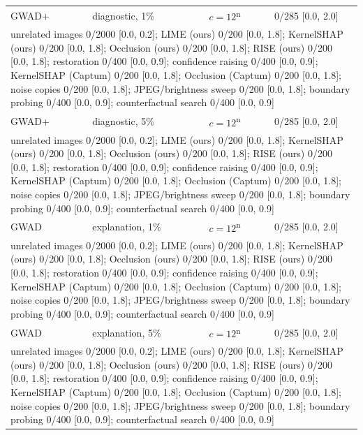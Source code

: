 \begin{footnotesize}
\begin{longtable}{p{1.6cm}p{2.6cm}p{2.8cm}p{4.6cm}}
GWAD+ & diagnostic, 1\% & $c=12$\textsuperscript{n} & 0/285 [0.0, 2.0] \\
\multicolumn{4}{p{12.8cm}}{\raggedright\quad unrelated images 0/2000 [0.0, 0.2]; LIME (ours) 0/200 [0.0, 1.8]; KernelSHAP (ours) 0/200 [0.0, 1.8]; Occlusion (ours) 0/200 [0.0, 1.8]; RISE (ours) 0/200 [0.0, 1.8]; restoration 0/400 [0.0, 0.9]; confidence raising 0/400 [0.0, 0.9]; KernelSHAP (Captum) 0/200 [0.0, 1.8]; Occlusion (Captum) 0/200 [0.0, 1.8]; noise copies 0/200 [0.0, 1.8]; JPEG/brightness sweep 0/200 [0.0, 1.8]; boundary probing 0/400 [0.0, 0.9]; counterfactual search 0/400 [0.0, 0.9]} \\[4pt]
GWAD+ & diagnostic, 5\% & $c=12$\textsuperscript{n} & 0/285 [0.0, 2.0] \\
\multicolumn{4}{p{12.8cm}}{\raggedright\quad unrelated images 0/2000 [0.0, 0.2]; LIME (ours) 0/200 [0.0, 1.8]; KernelSHAP (ours) 0/200 [0.0, 1.8]; Occlusion (ours) 0/200 [0.0, 1.8]; RISE (ours) 0/200 [0.0, 1.8]; restoration 0/400 [0.0, 0.9]; confidence raising 0/400 [0.0, 0.9]; KernelSHAP (Captum) 0/200 [0.0, 1.8]; Occlusion (Captum) 0/200 [0.0, 1.8]; noise copies 0/200 [0.0, 1.8]; JPEG/brightness sweep 0/200 [0.0, 1.8]; boundary probing 0/400 [0.0, 0.9]; counterfactual search 0/400 [0.0, 0.9]} \\[4pt]
GWAD & explanation, 1\% & $c=12$\textsuperscript{n} & 0/285 [0.0, 2.0] \\
\multicolumn{4}{p{12.8cm}}{\raggedright\quad unrelated images 0/2000 [0.0, 0.2]; LIME (ours) 0/200 [0.0, 1.8]; KernelSHAP (ours) 0/200 [0.0, 1.8]; Occlusion (ours) 0/200 [0.0, 1.8]; RISE (ours) 0/200 [0.0, 1.8]; restoration 0/400 [0.0, 0.9]; confidence raising 0/400 [0.0, 0.9]; KernelSHAP (Captum) 0/200 [0.0, 1.8]; Occlusion (Captum) 0/200 [0.0, 1.8]; noise copies 0/200 [0.0, 1.8]; JPEG/brightness sweep 0/200 [0.0, 1.8]; boundary probing 0/400 [0.0, 0.9]; counterfactual search 0/400 [0.0, 0.9]} \\[4pt]
GWAD & explanation, 5\% & $c=12$\textsuperscript{n} & 0/285 [0.0, 2.0] \\
\multicolumn{4}{p{12.8cm}}{\raggedright\quad unrelated images 0/2000 [0.0, 0.2]; LIME (ours) 0/200 [0.0, 1.8]; KernelSHAP (ours) 0/200 [0.0, 1.8]; Occlusion (ours) 0/200 [0.0, 1.8]; RISE (ours) 0/200 [0.0, 1.8]; restoration 0/400 [0.0, 0.9]; confidence raising 0/400 [0.0, 0.9]; KernelSHAP (Captum) 0/200 [0.0, 1.8]; Occlusion (Captum) 0/200 [0.0, 1.8]; noise copies 0/200 [0.0, 1.8]; JPEG/brightness sweep 0/200 [0.0, 1.8]; boundary probing 0/400 [0.0, 0.9]; counterfactual search 0/400 [0.0, 0.9]} \\[4pt]

\end{longtable}
\end{footnotesize}
